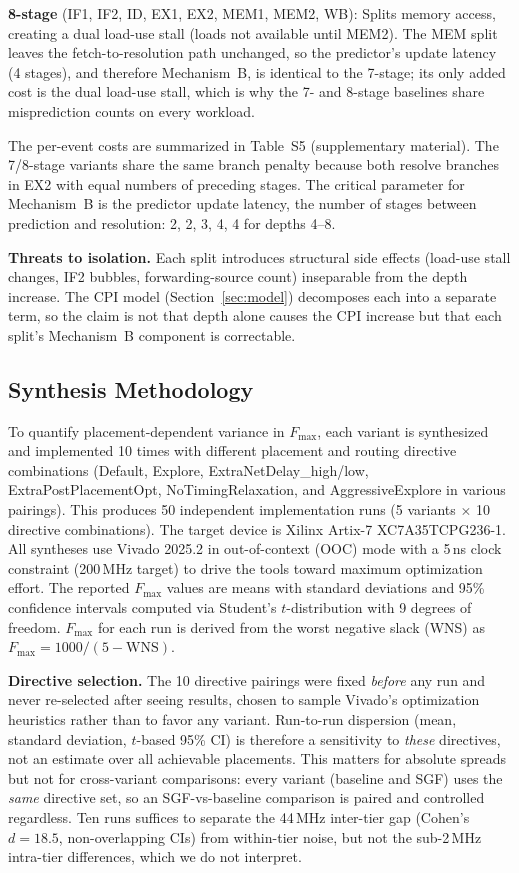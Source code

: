 \documentclass[acmsmall,nonacm,screen]{acmart}
\begin{document}
\textbf{8-stage} (IF1, IF2, ID, EX1, EX2, MEM1, MEM2, WB): Splits memory access, creating a dual load-use stall (loads not available until MEM2). The MEM split leaves the fetch-to-resolution path unchanged, so the predictor's update latency (4 stages), and therefore Mechanism~B, is identical to the 7-stage; its only added cost is the dual load-use stall, which is why the 7- and 8-stage baselines share misprediction counts on every workload.

The per-event costs are summarized in Table~S5 (supplementary material).
The 7/8-stage variants share the same branch penalty because both resolve branches in EX2 with equal numbers of preceding stages.
The critical parameter for Mechanism~B is the predictor update latency, the number of stages between prediction and resolution: 2, 2, 3, 4, 4 for depths 4--8.

\textbf{Threats to isolation.}
Each split introduces structural side effects (load-use stall changes, IF2 bubbles, forwarding-source count) inseparable from the depth increase. The CPI model (Section~\ref{sec:model}) decomposes each into a separate term, so the claim is not that depth alone causes the CPI increase but that each split's Mechanism~B component is correctable.

\subsection{Synthesis Methodology}
\label{sec:synth_method}

To quantify placement-dependent variance in $F_{\max}$, each variant is synthesized and implemented 10 times with different placement and routing directive combinations (Default, Explore, ExtraNetDelay\_high/low, ExtraPostPlacementOpt, NoTimingRelaxation, and AggressiveExplore in various pairings).
This produces 50 independent implementation runs (5 variants $\times$ 10 directive combinations).
The target device is Xilinx Artix-7 XC7A35TCPG236-1.
All syntheses use Vivado 2025.2 in out-of-context (OOC) mode with a 5\,ns clock constraint (200\,MHz target) to drive the tools toward maximum optimization effort.
The reported $F_{\max}$ values are means with standard deviations and 95\% confidence intervals computed via Student's $t$-distribution with 9 degrees of freedom.
$F_{\max}$ for each run is derived from the worst negative slack (WNS) as $F_{\max} = 1000/(5 - \text{WNS})$.

\textbf{Directive selection.}
The 10 directive pairings were fixed \emph{before} any run and never re-selected after seeing results, chosen to sample Vivado's optimization heuristics rather than to favor any variant.
Run-to-run dispersion (mean, standard deviation, $t$-based 95\% CI) is therefore a sensitivity to \emph{these} directives, not an estimate over all achievable placements.
This matters for absolute spreads but not for cross-variant comparisons: every variant (baseline and SGF) uses the \emph{same} directive set, so an SGF-vs-baseline comparison is paired and controlled regardless.
Ten runs suffices to separate the 44\,MHz inter-tier gap (Cohen's $d = 18.5$, non-overlapping CIs) from within-tier noise, but not the sub-2\,MHz intra-tier differences, which we do not interpret.
\end{document}

